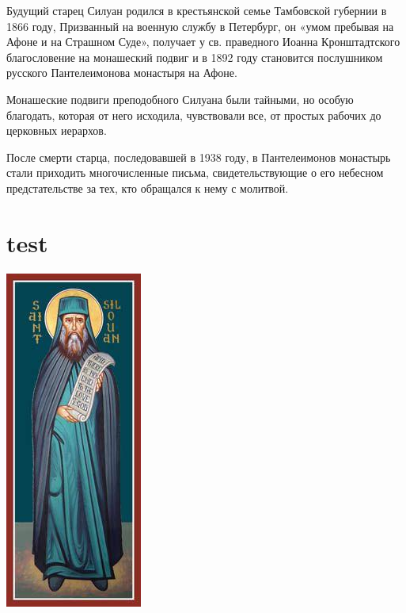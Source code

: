 \documentclass[12pt,a4paper]{article}
\begin{document}
\begin{window}
Будущий старец Силуан родился в крестьянской семье Тамбовской губернии в 1866 году, Призванный на военную службу в Петербург, он «умом пребывая на Афоне и на Страшном Суде», получает у св. праведного Иоанна Кронштадтского благословение на монашеский подвиг и в 1892 году становится послушником русского Пантелеимонова монастыря на Афоне.

\par Монашеские подвиги преподобного Силуана были тайными, но особую благодать, которая от него исходила, чувствовали все, от простых рабочих до церковных иерархов. 






После смерти старца, последовавшей в 1938 году, в Пантелеимонов монастырь стали приходить многочисленные письма, свидетельствующие о его небесном предстательстве за тех, кто обращался к нему с молитвой.
\end{window}

\newpage\section{test}

\begin{floatingfigure}[l]{0.2\textwidth}
\centering
\includegraphics[width=0.2\linewidth]{img/521.jpg}
\end{floatingfigure}
\end{document}
